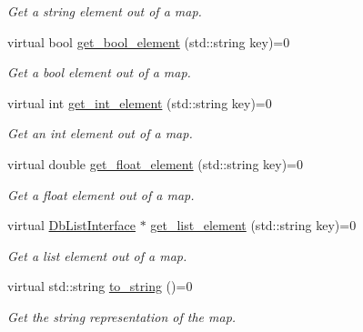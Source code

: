 \begin{DoxyCompactItemize}
\begin{DoxyCompactList}\small\item\em Get a string element out of a map. \end{DoxyCompactList}\item 
\hypertarget{classDbMapInterface_a402f75085fa2dacc8808d4b3650bd652}{virtual bool \hyperlink{classDbMapInterface_a402f75085fa2dacc8808d4b3650bd652}{get\-\_\-bool\-\_\-element} (std\-::string key)=0}\label{classDbMapInterface_a402f75085fa2dacc8808d4b3650bd652}

\begin{DoxyCompactList}\small\item\em Get a bool element out of a map. \end{DoxyCompactList}\item 
\hypertarget{classDbMapInterface_af64b01be1c5046a7f24ad6ca0679eb2e}{virtual int \hyperlink{classDbMapInterface_af64b01be1c5046a7f24ad6ca0679eb2e}{get\-\_\-int\-\_\-element} (std\-::string key)=0}\label{classDbMapInterface_af64b01be1c5046a7f24ad6ca0679eb2e}

\begin{DoxyCompactList}\small\item\em Get an int element out of a map. \end{DoxyCompactList}\item 
\hypertarget{classDbMapInterface_ae621d8af1d1a181790e4af2377caae3a}{virtual double \hyperlink{classDbMapInterface_ae621d8af1d1a181790e4af2377caae3a}{get\-\_\-float\-\_\-element} (std\-::string key)=0}\label{classDbMapInterface_ae621d8af1d1a181790e4af2377caae3a}

\begin{DoxyCompactList}\small\item\em Get a float element out of a map. \end{DoxyCompactList}\item 
\hypertarget{classDbMapInterface_aa6cdf8e968d4f5c46e9f24abff10133d}{virtual \hyperlink{classDbListInterface}{Db\-List\-Interface} $\ast$ \hyperlink{classDbMapInterface_aa6cdf8e968d4f5c46e9f24abff10133d}{get\-\_\-list\-\_\-element} (std\-::string key)=0}\label{classDbMapInterface_aa6cdf8e968d4f5c46e9f24abff10133d}

\begin{DoxyCompactList}\small\item\em Get a list element out of a map. \end{DoxyCompactList}\item 
\hypertarget{classDbMapInterface_ad42e26caf01cf8bae0f98db95e32202c}{virtual std\-::string \hyperlink{classDbMapInterface_ad42e26caf01cf8bae0f98db95e32202c}{to\-\_\-string} ()=0}\label{classDbMapInterface_ad42e26caf01cf8bae0f98db95e32202c}

\begin{DoxyCompactList}\small\item\em Get the string representation of the map. \end{DoxyCompactList}\end{DoxyCompactItemize}


